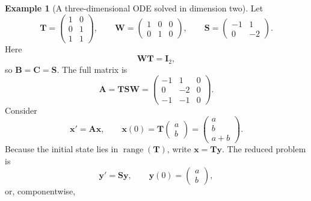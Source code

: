 \documentclass[11pt]{article}
\newcommand{\I}{\mathbf{I}}
\newcommand{\mat}[1]{\mathbf{#1}}
\newcommand{\vect}[1]{\mathbf{#1}}
\newcommand{\range}{\operatorname{range}}
\theoremstyle{definition}
\newtheorem{example}[example]{Example}
\theoremstyle{remark}
\begin{document}
\begin{example}[A three-dimensional ODE solved in dimension two]
\label{ex:ode-three-to-two}
Let
\begin{equation}
  \mat{T}=
  \begin{pmatrix}
    1&0\\
    0&1\\
    1&1
  \end{pmatrix},
  \qquad
  \mat{W}=
  \begin{pmatrix}
    1&0&0\\
    0&1&0
  \end{pmatrix},
  \qquad
  \mat{S}=
  \begin{pmatrix}
    -1&1\\
    0&-2
  \end{pmatrix}.
  \label{eq:ode-example-factors}
\end{equation}
Here
\begin{equation}
  \mat{W}\mat{T}=\I_2,
  \label{eq:ode-example-WT}
\end{equation}
so \(\mat{B}=\mat{C}=\mat{S}\). The full matrix is
\begin{equation}
  \mat{A}
  =\mat{T}\mat{S}\mat{W}
  =
  \begin{pmatrix}
    -1&1&0\\
    0&-2&0\\
    -1&-1&0
  \end{pmatrix}.
  \label{eq:ode-example-A}
\end{equation}
Consider
\begin{equation}
  \vect{x}'=\mat{A}\vect{x},
  \qquad
  \vect{x}(0)=\mat{T}
  \begin{pmatrix}a\\b\end{pmatrix}
  =
  \begin{pmatrix}a\\b\\a+b\end{pmatrix}.
  \label{eq:ode-example-full}
\end{equation}
Because the initial state lies in \(\range(\mat{T})\), write
\(\vect{x}=\mat{T}\vect{y}\). The reduced problem is
\begin{equation}
  \vect{y}'=\mat{S}\vect{y},
  \qquad
  \vect{y}(0)=
  \begin{pmatrix}a\\b\end{pmatrix},
  \label{eq:ode-example-reduced}
\end{equation}
or, componentwise,
\begin{align}

\end{align}
\end{example}
\end{document}
